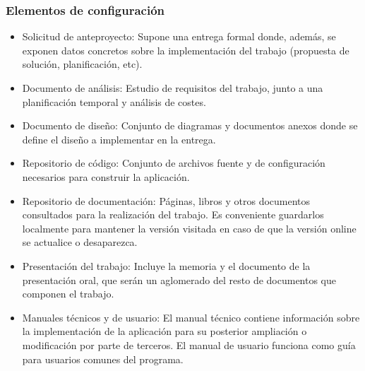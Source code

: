 \documentclass[10pt,a4paper]{article}
\begin{document}
			\subsubsection{Elementos de configuración} 
			\begin{itemize}
                \item Solicitud de anteproyecto: Supone una entrega formal donde, además, se exponen datos concretos sobre la implementación del trabajo (propuesta de solución, planificación, etc).
                \item Documento de análisis: Estudio de requisitos del trabajo, junto a una planificación temporal y análisis de costes.
                \item Documento de diseño: Conjunto de diagramas y documentos anexos donde se define el diseño a implementar en la entrega.
                \item Repositorio de código: Conjunto de archivos fuente y de configuración necesarios para construir la aplicación.
                 \item Repositorio de documentación: Páginas, libros y otros documentos consultados para la realización del trabajo. Es conveniente guardarlos localmente para mantener la versión visitada en caso de que la versión online se actualice o desaparezca.
                 \item Presentación del trabajo: Incluye la memoria y el documento de la presentación oral, que serán un aglomerado del resto de documentos que componen el trabajo.
                 \item Manuales técnicos y de usuario: El manual técnico contiene información sobre la implementación de la                         aplicación para su posterior ampliación o modificación por parte de terceros. El manual de usuario funciona como guía para usuarios comunes del programa.
            \end{itemize}
\end{document}
